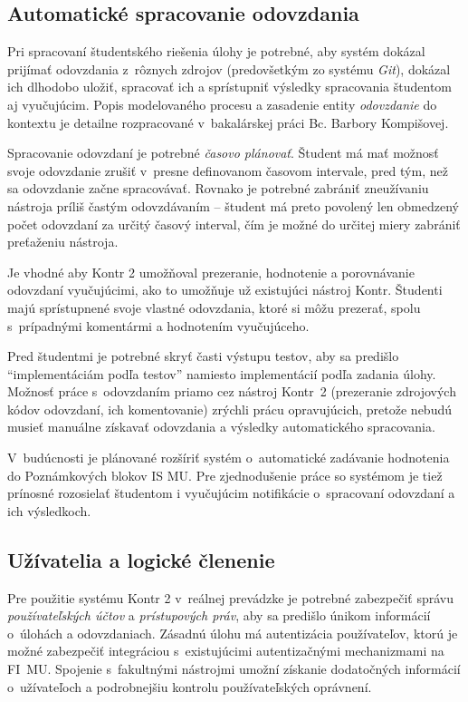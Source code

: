 \documentclass[
  digital, %
  oneside, %
  table,   %
  lof,     %
  lot,   %
]{fithesis3}
\begin{document}
\subsection{Automatické spracovanie odovzdania}

Pri spracovaní študentského riešenia úlohy je potrebné, aby systém dokázal prijímať odovzdania z~rôznych zdrojov (predovšetkým zo systému \emph{Git}), dokázal ich dlhodobo uložiť, spracovať ich a sprístupniť výsledky spracovania študentom aj vyučujúcim. Popis modelovaného procesu a zasadenie entity \textit{odovzdanie} do kontextu je detailne rozpracované v~bakalárskej práci Bc. Barbory Kompišovej\cite{kontr-portal}.

Spracovanie odovzdaní je potrebné \emph{časovo plánovať}. Študent má mať možnosť svoje odovzdanie zrušiť v~presne definovanom časovom intervale, pred tým, než sa odovzdanie začne spracovávať. Rovnako je potrebné zabrániť zneužívaniu nástroja príliš častým odovzdávaním -- študent má preto povolený len obmedzený počet odovzdaní za určitý časový interval, čím je možné do určitej miery zabrániť preťaženiu nástroja.

Je vhodné aby Kontr 2 umožňoval prezeranie, hodnotenie a porovnávanie odovzdaní vyučujúcimi, ako to umožňuje už existujúci nástroj Kontr.
Študenti majú sprístupnené svoje vlastné odovzdania, ktoré si môžu prezerať, spolu s~prípadnými komentármi a hodnotením vyučujúceho. 

Pred študentmi je potrebné skryť časti výstupu testov, aby sa predišlo "`implementáciám podľa testov"' namiesto implementácií podľa zadania úlohy. Možnosť práce s~odovzdaním priamo cez nástroj Kontr~2 (prezeranie zdrojových kódov odovzdaní, ich komentovanie) zrýchli prácu opravujúcich, pretože nebudú musieť manuálne získavať odovzdania a výsledky automatického spracovania. 

V~budúcnosti je plánované rozšíriť systém o~automatické zadávanie hodnotenia do Poznámkových blokov IS MU. Pre zjednodušenie práce so systémom je tiež prínosné rozosielať študentom i vyučujúcim notifikácie o~spracovaní odovzdaní a ich výsledkoch. 

\subsection{Užívatelia a logické členenie}

Pre použitie systému Kontr 2 v~reálnej prevádzke je potrebné zabezpečiť správu \emph{používateľských účtov} a \emph{prístupových práv}, aby sa predišlo únikom informácií o~úlohách a odovzdaniach. Zásadnú úlohu má autentizácia používateľov, ktorú je možné zabezpečiť integráciou s~existujúcimi autentizačnými mechanizmami na FI~MU. Spojenie s~fakultnými nástrojmi umožní získanie dodatočných informácií o~užívateľoch a podrobnejšiu kontrolu používateľských oprávnení.
\end{document}
